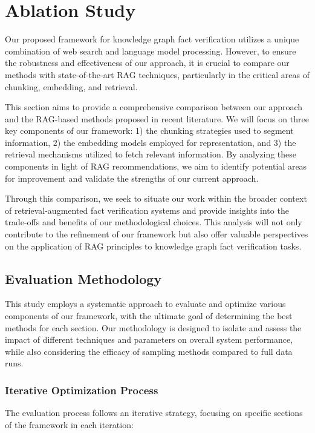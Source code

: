 \chapter{Ablation Study}
\label{ch:ablation}
Our proposed framework for knowledge graph fact verification utilizes a unique combination of web search and language model processing.
However, to ensure the robustness and effectiveness of our approach, it is crucial to compare our methods with state-of-the-art RAG techniques, particularly in the critical areas of chunking, embedding, and retrieval.

This section aims to provide a comprehensive comparison between our approach and the RAG-based methods proposed in recent literature.
We will focus on three key components of our framework: 1) the chunking strategies used to segment information, 2) the embedding models employed for representation, and 3) the retrieval mechanisms utilized to fetch relevant information.
By analyzing these components in light of RAG recommendations, we aim to identify potential areas for improvement and validate the strengths of our current approach.

Through this comparison, we seek to situate our work within the broader context of retrieval-augmented fact verification systems and provide insights into the trade-offs and benefits of our methodological choices.
This analysis will not only contribute to the refinement of our framework but also offer valuable perspectives on the application of RAG principles to knowledge graph fact verification tasks.
\section{Evaluation Methodology}\label{sec:evaluation-methodology}
This study employs a systematic approach to evaluate and optimize various components of our framework, with the ultimate goal of determining the best methods for each section.
Our methodology is designed to isolate and assess the impact of different techniques and parameters on overall system performance, while also considering the efficacy of sampling methods compared to full data runs.

\subsection{Iterative Optimization Process}\label{subsec:iterative-optimization-process}
The evaluation process follows an iterative strategy, focusing on specific sections of the framework in each iteration:


